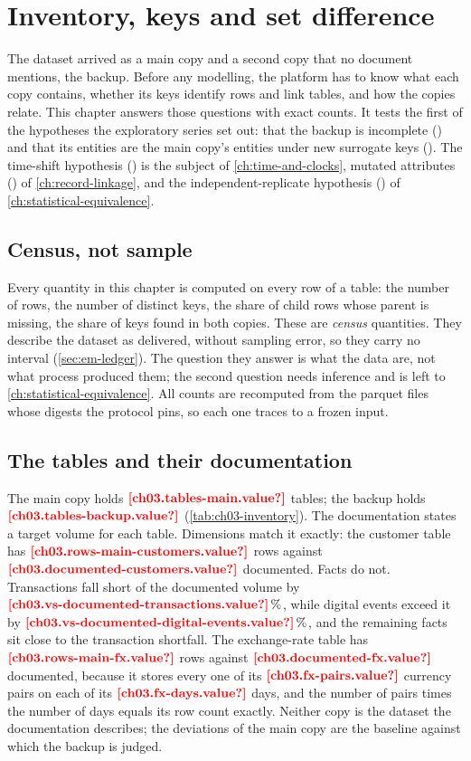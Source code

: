 \chapter{Inventory, keys and set difference}\label{ch:inventory-keys}

The dataset arrived as a main copy and a second copy that no document mentions, the backup. Before any modelling,
the platform has to know what each copy contains, whether its keys identify rows and link tables, and how the copies
relate. This chapter answers those questions with exact counts. It tests the first of the hypotheses the exploratory
series set out: that the backup is incomplete () and that its entities are the main copy's entities under
new surrogate keys (). The time-shift hypothesis () is the subject of \cref{ch:time-and-clocks},
mutated attributes () of \cref{ch:record-linkage}, and the independent-replicate hypothesis () of
\cref{ch:statistical-equivalence}.

\section{Census, not sample}\label{sec:inv-census}

Every quantity in this chapter is computed on every row of a table: the number of rows, the number of distinct keys,
the share of child rows whose parent is missing, the share of keys found in both copies. These are \emph{census}
quantities. They describe the dataset as delivered, without sampling error, so they carry no interval
(\cref{sec:em-ledger}). The question they answer is what the data are, not what process produced them; the second
question needs inference and is left to \cref{ch:statistical-equivalence}. All counts are recomputed from the
parquet files whose digests the protocol pins, so each one traces to a frozen input.

\section{The tables and their documentation}\label{sec:inv-tables}

The main copy holds $\est{ch03.tables-main}{value}$ tables; the backup holds $\est{ch03.tables-backup}{value}$
(\cref{tab:ch03-inventory}). The documentation states a target volume for each table. Dimensions match it exactly:
the customer table has $\est{ch03.rows-main-customers}{value}$ rows against $\est{ch03.documented-customers}{value}$
documented. Facts do not. Transactions fall short of the documented volume by
$\est{ch03.vs-documented-transactions}{value}\,\%$, while digital events exceed it by
$\est{ch03.vs-documented-digital-events}{value}\,\%$, and the remaining facts sit close to the transaction shortfall.
The exchange-rate table has $\est{ch03.rows-main-fx}{value}$ rows against $\est{ch03.documented-fx}{value}$ documented,
because it stores every one of its $\est{ch03.fx-pairs}{value}$ currency pairs on each of its
$\est{ch03.fx-days}{value}$ days, and the number of pairs times the number of days equals its row count exactly. Neither copy is the dataset
the documentation describes; the deviations of the main copy are the baseline against which the backup is judged.


